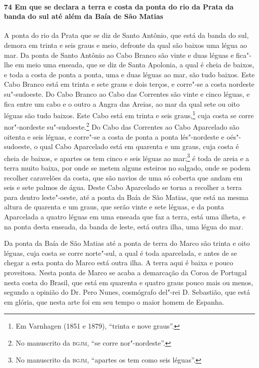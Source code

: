 \begin{linenumbers}
\paragraph{74 Em que se declara a terra e costa da ponta do rio da Prata da banda do sul
até além da Baía de São Matias} \quad
A ponta do rio da Prata que se diz de Santo Antônio, que está da banda do sul, demora em
trinta e seis graus e meio, defronte da qual são baixos uma légua ao mar. Da ponta de
Santo Antônio ao Cabo Branco são vinte e duas léguas e fica"-lhe em meio uma enseada, que
se diz de Santa Apolonia, a qual é cheia de baixos, e toda a costa de ponta a ponta, uma e
duas léguas ao mar, são tudo baixos. Este Cabo Branco está em trinta e sete graus e dois
terços, e corre"-se a costa nordeste su"-sudoeste. Do Cabo Branco ao Cabo das Correntes são
vinte e cinco léguas, e fica entre um cabo e o outro a Angra das Areias, ao mar da qual
sete ou oito léguas são tudo baixos. Este Cabo está em trinta e seis graus,\footnote{ Em
Varnhagen (1851 e 1879), ``trinta e nove graus''.} cuja costa se corre nor"-nordeste
su"-sudoeste.\footnote{ No manuscrito da \textsc{bgjm}, ``se corre nor"-nordeste''.} Do
Cabo das Correntes ao Cabo Aparcelado são oitenta e seis léguas, e corre"-se a costa de
ponta a ponta lés"-nordeste e oés"-sudoeste, o qual Cabo Aparcelado está em quarenta e um
graus, cuja costa é cheia de baixos, e apartes os tem cinco e seis léguas ao
mar;\footnote{ No manuscrito da \textsc{bgjm}, ``apartes os tem como seis léguas''.} é
toda de areia e a terra muito baixa, por onde se metem alguns esteiros no salgado, onde se
podem recolher caravelões da costa, que são navios de uma só coberta que andam em seis e
sete palmos de água. Deste Cabo Aparcelado se torna a recolher a terra para dentro
leste"-oeste, até a ponta da Baía de São Matias, que está na mesma altura de quarenta e um
graus, que serão vinte e sete léguas, e da ponta Aparcelada a quatro léguas em uma enseada
que faz a terra, está uma ilheta, e na ponta desta enseada, da banda de leste, está outra
ilha, uma légua do mar.

Da ponta da Baía de São Matias até a ponta de terra do Marco são trinta e oito léguas,
cuja costa se corre norte"-sul, a qual é toda aparcelada, e antes de se chegar a esta ponta
do Marco está outra ilha. A terra aqui é baixa e pouco proveitosa. Nesta ponta de Marco se
acaba a demarcação da Coroa de Portugal nesta costa do Brasil, que está em quarenta e
quatro graus pouco mais ou menos, segundo a opinião do Dr. Pero Nunes, cosmógrafo del"-rei
D. Sebastião, que está em glória, que nesta arte foi em seu tempo o maior homem de
Espanha.

\end{linenumbers}

